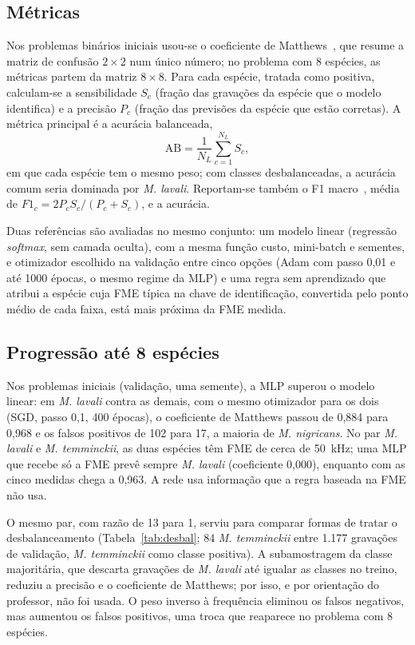 \documentclass{sbrt}
\begin{document}
\subsection{Métricas}

Nos problemas binários iniciais usou-se o coeficiente de Matthews~\cite{matthews}, que resume a matriz de confusão $2\times 2$ num único número; no problema com 8 espécies, as métricas partem da matriz $8\times 8$. Para cada espécie, tratada como positiva, calculam-se a sensibilidade $S_c$ (fração das gravações da espécie que o modelo identifica) e a precisão $P_c$ (fração das previsões da espécie que estão corretas). A métrica principal é a acurácia balanceada,
\begin{equation}
\mathrm{AB}=\frac{1}{N_L}\sum_{c=1}^{N_L}S_c,
\end{equation}
em que cada espécie tem o mesmo peso; com classes desbalanceadas, a acurácia comum seria dominada por \textit{M. lavali}. Reportam-se também o F1 macro~\cite{grandini}, média de $F1_c=2P_cS_c/(P_c+S_c)$, e a acurácia.

Duas referências são avaliadas no mesmo conjunto: um modelo linear (regressão \textit{softmax}, sem camada oculta), com a mesma função custo, mini-batch e sementes, e otimizador escolhido na validação entre cinco opções (Adam com passo 0,01 e até 1000 épocas, o mesmo regime da MLP) e uma regra sem aprendizado que atribui a espécie cuja FME típica na chave de identificação, convertida pelo ponto médio de cada faixa, está mais próxima da FME medida.

\subsection{Progressão até 8 espécies}

Nos problemas iniciais (validação, uma semente), a MLP superou o modelo linear: em \textit{M. lavali} contra as demais, com o mesmo otimizador para os dois (SGD, passo 0,1, 400 épocas), o coeficiente de Matthews passou de 0,884 para 0,968 e os falsos positivos de 102 para 17, a maioria de \textit{M. nigricans}. No par \textit{M. lavali} e \textit{M. temminckii}, as duas espécies têm FME de cerca de 50~kHz; uma MLP que recebe só a FME prevê sempre \textit{M. lavali} (coeficiente 0,000), enquanto com as cinco medidas chega a 0,963. A rede usa informação que a regra baseada na FME não usa.

O mesmo par, com razão de 13 para 1, serviu para comparar formas de tratar o desbalanceamento (Tabela~\ref{tab:desbal}; 84 \textit{M. temminckii} entre 1.177 gravações de validação, \textit{M. temminckii} como classe positiva). A subamostragem da classe majoritária, que descarta gravações de \textit{M. lavali} até igualar as classes no treino, reduziu a precisão e o coeficiente de Matthews; por isso, e por orientação do professor, não foi usada. O peso inverso à frequência eliminou os falsos negativos, mas aumentou os falsos positivos, uma troca que reaparece no problema com 8 espécies.
\end{document}
